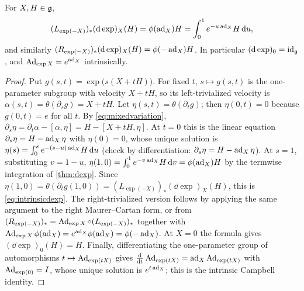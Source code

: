 \begin{proposition}\label{prop:intrinsicdexp}
For $X,H\in\mathfrak{g}$,
\begin{equation}\label{eq:intrinsicdexp}
 (L_{\exp(-X)})_*(\mathrm{d}\exp)_X(H)=\phi(\operatorname{ad}_X)H=\int_0^1e^{-u\operatorname{ad}_X}H\,\mathrm{d} u,
\end{equation}
and similarly $(R_{\exp(-X)})_*(\mathrm{d}\exp)_X(H)=\phi(-\operatorname{ad}_X)H$. In
particular $(\mathrm{d}\exp)_0=\operatorname{id}_{\mathfrak{g}}$, and $\operatorname{Ad}_{\exp X}=e^{\operatorname{ad}_X}$ intrinsically.
\end{proposition}
\begin{proof}
Put $g(s,t)=\exp\bigl(s(X+tH)\bigr)$. For fixed $t$, $s\mapsto g(s,t)$ is
the one-parameter subgroup with velocity $X+tH$, so its left-trivialized
velocity is $\alpha(s,t)=\theta(\partial_sg)=X+tH$. Let
$\eta(s,t)=\theta(\partial_tg)$; then $\eta(0,t)=0$ because $g(0,t)=e$
for all $t$. By \eqref{eq:mixedvariation},
$\partial_s\eta=\partial_t\alpha-[\alpha,\eta]=H-[X+tH,\eta]$. At $t=0$
this is the linear equation $\partial_s\eta=H-\operatorname{ad}_X\eta$ with
$\eta(0)=0$, whose unique solution is
$\eta(s)=\int_0^se^{-(s-u)\operatorname{ad}_X}H\,\mathrm{d} u$ (check by differentiation:
$\partial_s\eta=H-\operatorname{ad}_X\eta$). At $s=1$, substituting $v=1-u$,
$\eta(1,0)=\int_0^1e^{-v\operatorname{ad}_X}H\,\mathrm{d} v=\phi(\operatorname{ad}_X)H$ by the termwise
integration of \cref{thm:dexp}. Since $\eta(1,0)=\theta(\partial_tg(1,0))
=(L_{\exp(-X)})_*(\dd\exp)_X(H)$, this is \eqref{eq:intrinsicdexp}. The
right-trivialized version follows by applying the same argument to the
right Maurer--Cartan form, or from
$(R_{\exp(-X)})_*=\operatorname{Ad}_{\exp X}\circ(L_{\exp(-X)})_*$ together with
$\operatorname{Ad}_{\exp X}\phi(\operatorname{ad}_X)=e^{\operatorname{ad}_X}\phi(\operatorname{ad}_X)=\phi(-\operatorname{ad}_X)$. At $X=0$ the
formula gives $(\dd\exp)_0(H)=H$. Finally, differentiating the
one-parameter group of automorphisms $t\mapsto\operatorname{Ad}_{\exp(tX)}$ gives
$\frac{\mathrm{d}}{\mathrm{d} t}\operatorname{Ad}_{\exp(tX)}=\operatorname{ad}_X\operatorname{Ad}_{\exp(tX)}$ with
$\operatorname{Ad}_{\exp(0)}=I$, whose unique solution is $e^{t\operatorname{ad}_X}$; this is the
intrinsic Campbell identity.
\end{proof}

